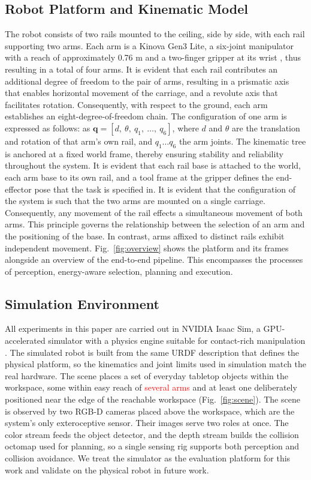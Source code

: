 \documentclass[conference]{IEEEtran}
\begin{document}
\subsection{Robot Platform and Kinematic Model}

The robot consists of two rails mounted to the ceiling, side by side, with each rail 
supporting two arms. Each arm is a Kinova Gen3 Lite, a six-joint manipulator 
with a reach of approximately 0.76 m and a two-finger gripper at its 
wrist \cite{Kinova}, thus resulting in a total of four arms.  
It is evident that each rail contributes an additional degree of freedom 
to the pair of arms, resulting in a prismatic axis that enables horizontal 
movement of the carriage, and a revolute axis that facilitates rotation. 
Consequently, with respect to the ground, each arm establishes an 
eight-degree-of-freedom chain. The configuration of one arm is expressed as follows:
as $\mathbf{q} = [d,\ \theta,\ q_1,\ \ldots,\ q_6]$, where $d$ and $\theta$ are the translation 
and rotation of that arm's own rail, and $q_1 \ldots q_6$ the arm joints.  
The kinematic tree is anchored at a fixed world frame, thereby ensuring stability 
and reliability throughout the system. It is evident that each rail base is attached 
to the world, each arm base to its own rail, and a tool frame at the gripper defines 
the end-effector pose that the task is specified in. It is evident that the configuration 
of the system is such that the two arms are mounted on a single carriage. Consequently, 
any movement of the rail effects a simultaneous movement of both arms. This principle 
governs the relationship between the selection of an arm and the positioning of the base. 
In contrast, arms affixed to distinct rails exhibit independent movement. Fig.~\ref{fig:overview}
shows the platform and its frames alongside an overview of the end-to-end pipeline. 
This encompasses the processes of perception, energy-aware selection, planning 
and execution.

\subsection{Simulation Environment}

All experiments in this paper are carried out in NVIDIA Isaac Sim, a
GPU-accelerated simulator with a physics engine suitable for contact-rich
manipulation \cite{IsaacSim2026,Mittal2023}. The simulated robot is built from the
same URDF description that defines the physical platform, so the kinematics and
joint limits used in simulation match the real hardware. The scene places a set of
everyday tabletop objects within the workspace, some within easy reach of \textcolor{red}{several arms}
and at least one deliberately positioned near the edge of the reachable workspace
(Fig.~\ref{fig:scene}). The scene is observed by two RGB-D cameras placed above the
workspace, which are the system's only exteroceptive sensor. Their images serve two
roles at once. The color stream feeds the object detector, and the depth stream
builds the collision octomap used for planning, so a single sensing rig supports
both perception and collision avoidance. We treat the simulator as the evaluation
platform for this work and validate on the physical robot in future work.
\end{document}
